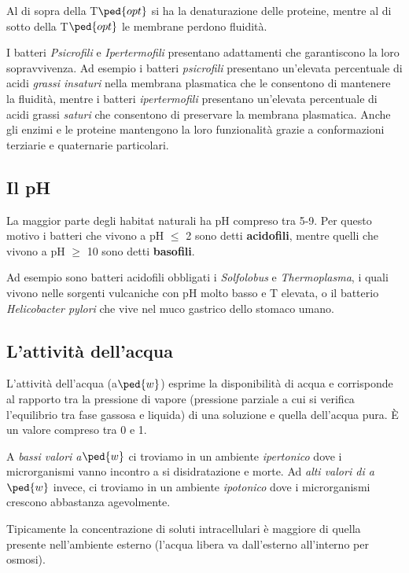 \documentclass[11pt]{book}
\begin{document}
Al di sopra della T$\ped{opt}$ si ha la denaturazione delle proteine, mentre al di sotto della T$\ped{opt}$ le membrane perdono fluidità.

\vspace{1em}
I batteri \emph{Psicrofili} e \emph{Ipertermofili} presentano adattamenti che garantiscono la loro sopravvivenza.
Ad esempio i batteri \emph{psicrofili} presentano un’elevata percentuale di acidi \emph{grassi insaturi} nella membrana plasmatica che le consentono di mantenere la fluidità, mentre i batteri \emph{ipertermofili} presentano un’elevata percentuale di acidi grassi \emph{saturi} che consentono di preservare la membrana plasmatica. Anche gli enzimi e le proteine mantengono la loro funzionalità grazie a conformazioni terziarie e quaternarie particolari.

\subsection{Il pH}
La maggior parte degli habitat naturali ha pH compreso tra 5-9. Per questo motivo i batteri che vivono a pH $\le$ 2 sono detti \textbf{acidofili}, mentre quelli che vivono a pH $\ge$ 10 sono detti \textbf{basofili}.

Ad esempio sono batteri acidofili obbligati i \emph{Solfolobus} e \emph{Thermoplasma}, i quali vivono nelle sorgenti vulcaniche con pH molto basso e T elevata, o il batterio \emph{Helicobacter pylori} che vive nel muco gastrico dello stomaco umano.

\subsection{L'attività dell’acqua}
L’attività dell’acqua (a$\ped{w}$) esprime la disponibilità di acqua e corrisponde al rapporto tra la pressione di vapore (pressione parziale a cui si verifica l’equilibrio tra fase gassosa e liquida) di una soluzione e quella dell’acqua pura. \`E un valore compreso tra 0 e 1.

A \emph{bassi valori a$\ped{w}$} ci troviamo in un ambiente \emph{ipertonico} dove i microrganismi vanno incontro a si disidratazione e morte. 
Ad \emph{alti valori di a$\ped{w}$} invece, ci troviamo in un ambiente \emph{ipotonico} dove i microrganismi crescono abbastanza agevolmente.

Tipicamente la concentrazione di soluti intracellulari è maggiore di quella presente nell’ambiente esterno (l’acqua libera va dall’esterno all’interno per osmosi). 
\end{document}
